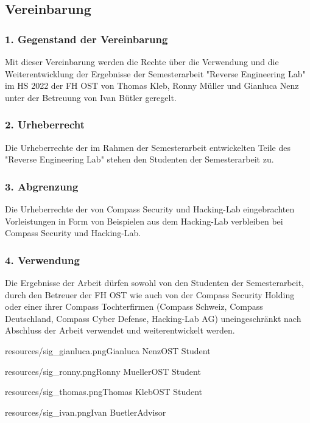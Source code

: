 \subsection*{Vereinbarung}
\subsubsection*{1. Gegenstand der Vereinbarung}
Mit dieser Vereinbarung werden die Rechte über die Verwendung und die Weiterentwicklung der Ergebnisse der Semesterarbeit "Reverse Engineering Lab" im HS 2022 der FH OST von Thomas Kleb, Ronny Müller und Gianluca Nenz unter der Betreuung von Ivan Bütler geregelt. \\

\vspace{-2ex}
\subsubsection*{2. Urheberrecht}
Die Urheberrechte der im Rahmen der Semesterarbeit entwickelten Teile des "Reverse Engineering Lab" stehen den Studenten der Semesterarbeit zu.\\

\vspace{-2ex}
\subsubsection*{3. Abgrenzung}
Die Urheberrechte der von Compass Security und Hacking-Lab eingebrachten Vorleistungen in Form von Beispielen aus dem Hacking-Lab verbleiben bei Compass Security und Hacking-Lab. \\

\vspace{-2ex}
\subsubsection*{4. Verwendung}
Die Ergebnisse der Arbeit dürfen sowohl von den Studenten der Semesterarbeit, durch den Betreuer der FH OST wie auch von der Compass Security Holding oder einer ihrer Compass Tochterfirmen (Compass Schweiz, Compass Deutschland, Compass Cyber Defense, Hacking-Lab AG) uneingeschränkt nach Abschluss der Arbeit verwendet und weiterentwickelt werden. \\

\vspace{-3ex}
\signature{0.6}{resources/sig_gianluca.png}{Gianluca Nenz}{OST Student}\hfill\signature{2}{resources/sig_ronny.png}{Ronny Mueller}{OST Student}

\signature{0.2}{resources/sig_thomas.png}{Thomas Kleb}{OST Student}\hfill \signature{0.75}{resources/sig_ivan.png}{Ivan Buetler}{Advisor}


